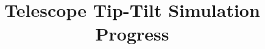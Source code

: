 \documentclass{article}
\title{Telescope Tip-Tilt Simulation Progress}
\begin{document}
	\section{}
\end{document}
